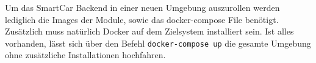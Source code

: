 Um das SmartCar Backend in einer neuen Umgebung auszurollen werden lediglich die Images der Module, sowie das docker-compose File benötigt. Zusätzlich muss natürlich Docker auf dem Zielsystem installiert sein. Ist alles vorhanden, lässt sich über den Befehl \texttt{docker-compose up} die gesamte Umgebung ohne zusätzliche Installationen hochfahren.


  

 
 
 
 
 
 
 
 
